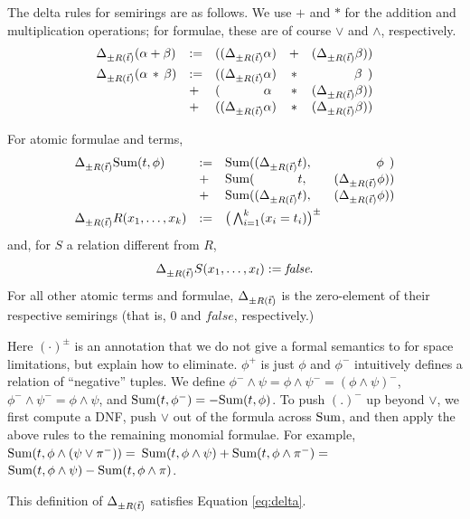 The delta rules for semirings are as follows. We use $+$ and $*$ for the
addition and multiplication operations; for formulae, these are of course
$\lor$ and $\land$, respectively.
\[\begin{array}{lllcr}
\Delta_{\pm R(\vec{t})} (\alpha + \beta) &:=& ((\Delta_{\pm R(\vec{t})} \alpha)    &+& (\Delta_{\pm R(\vec{t})} \beta))
\\[1ex]
\Delta_{\pm R(\vec{t})} (\alpha \,*\, \beta)
   &:=& ((\Delta_{\pm R(\vec{t})} \alpha)               &*& \beta\;\,) \\
   &+ & (\quad\quad\quad\;\, \alpha &*& (\Delta_{\pm R(\vec{t})} \beta)) \\
   &+ & ((\Delta_{\pm R(\vec{t})} \alpha)               &*& (\Delta_{\pm R(\vec{t})} \beta))
\end{array}\]

For atomic formulae and terms,
\[\begin{array}{lllr}
\Delta_{\pm R(\vec{t})} \mbox{Sum}(t, \phi)
   &:=& \mbox{Sum}((\Delta_{\pm R(\vec{t})} t), & \phi\;\,) \\
   &+ & \mbox{Sum}(\quad\quad\quad\; \,t,  & (\Delta_{\pm R(\vec{t})} \phi)) \\
   &+ & \mbox{Sum}((\Delta_{\pm R(\vec{t})} t), & (\Delta_{\pm R(\vec{t})} \phi))
\\[1ex]
\Delta_{\pm R(\vec{t})} R(x_1, \dots, x_k) &:=& \big( \bigwedge_{i=1}^k (x_i = t_i) \big)^\pm
\end{array}\]
and, for $S$ a relation different from $R$,
\[
\Delta_{\pm R(\vec{t})} S(x_1, \dots, x_l) := \textit{false}.
\]
For all other atomic terms and formulae, $\Delta_{\pm R(\vec{t})}$ is the zero-element
of their respective semirings (that is, $0$ and $\textit{false}$,
respectively.)

Here $(\cdot)^\pm$ is an annotation that we do not give a formal semantics
to for space limitations, but explain how to eliminate. $\phi^+$ is just
$\phi$ and $\phi^-$ intuitively defines a relation of ``negative'' tuples.
We define $\phi^- \land \psi = \phi \land \psi^- = (\phi \land \psi)^-$,
$\phi^- \land \psi^- = \phi \land \psi$, and
$\mbox{Sum}(t, \phi^-) = -\mbox{Sum}(t, \phi)$. To
push $(.)^-$ up beyond $\lor$, we first compute
a DNF, push $\lor$ out of the formula across $\mbox{Sum}$, and then apply
the above rules to the remaining monomial formulae.
For example,
$\mbox{Sum}(t, \phi \land (\psi \lor \pi^-)) =$
$\mbox{Sum}(t, \phi \land \psi) + \mbox{Sum}(t, \phi \land \pi^-) =$
$\mbox{Sum}(t, \phi \land \psi) - \mbox{Sum}(t, \phi \land \pi)$.


\begin{proposition}
\label{prop:delta-correct}
This definition of $\Delta_{\pm R(\vec{t})}$ satisfies Equation \ref{eq:delta}.
\end{proposition}


\def\duv{\Delta_{\pm R(u,v)}}
\def\dc{\Delta_{\pm C(c,n)}}


